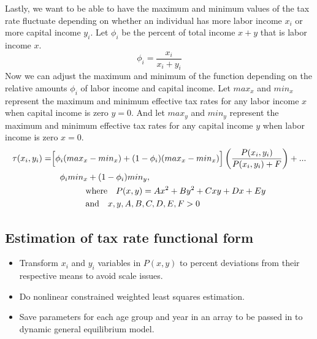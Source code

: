 \documentclass[letterpaper,12pt]{article}
\theoremstyle{definition}
\begin{document}
    Lastly, we want to be able to have the maximum and minimum values of the tax rate fluctuate depending on whether an individual has more labor income $x_i$ or more capital income $y_i$. Let $\phi_i$ be the percent of total income $x+y$ that is labor income $x$.
    \begin{equation}\label{EqPhi}
      \phi_i = \frac{x_i}{x_i+y_i}
    \end{equation}
    Now we can adjust the maximum and minimum of the function depending on the relative amounts $\phi_i$ of labor income and capital income. Let $max_x$ and $min_x$ represent the maximum and minimum effective tax rates for any labor income $x$ when capital income is zero $y=0$. And let $max_y$ and $min_y$ represent the maximum and minimum effective tax rates for any capital income $y$ when labor income is zero $x=0$.
    \begin{equation}\label{EqBivRatioQuad2}
      \begin{split}
        \tau(x_i,y_i) = &\Bigl[\phi_i(max_x - min_x) + (1 - \phi_i)(max_x - min_x)\Bigr]\left(\frac{P(x_i,y_i)}{P(x_i,y_i) + F}\right) + ... \\
        &\quad \phi_i min_x + (1 - \phi_i)min_y, \\
        &\qquad\qquad\text{where}\quad P(x,y) = Ax^2 + By^2 + Cxy + Dx + Ey \\
        &\qquad\qquad\text{and}\quad x,y,A,B,C,D,E,F>0
      \end{split}
    \end{equation}


  \subsection{Estimation of tax rate functional form}\label{SecFuncFormEst}

    \begin{itemize}
      \item Transform $x_i$ and $y_i$ variables in $P(x,y)$ to percent deviations from their respective means to avoid scale issues.
      \item Do nonlinear constrained weighted least squares estimation.
      \item Save parameters for each age group and year in an array to be passed in to dynamic general equilibrium model.
    \end{itemize}



\end{document}

